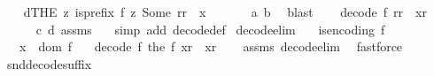 \begin{isabellebody}
\ \ \isamarkupfalse%
\ d{\isacharcolon}{\kern0pt}{\isachardoublequoteopen}{\isacharparenleft}{\kern0pt}THE\ z{\isachardot}{\kern0pt}\ is{\isacharunderscore}{\kern0pt}prefix\ {\isacharparenleft}{\kern0pt}f\ z{\isacharparenright}{\kern0pt}\ {\isacharparenleft}{\kern0pt}Some\ {\isacharparenleft}{\kern0pt}r{\isacharat}{\kern0pt}r{}{\isacharparenright}{\kern0pt}{\isacharparenright}{\kern0pt}{\isacharparenright}{\kern0pt}\ {\isacharequal}{\kern0pt}\ x{\isachardoublequoteclose}\ \isanewline
\ \ \ \ \isamarkupfalse%
\ a\ b\ \isamarkupfalse%
\ blast\isanewline
\ \ \isamarkupfalse%
\ {\isachardoublequoteopen}decode\ f\ {\isacharparenleft}{\kern0pt}r{\isacharat}{\kern0pt}r{}{\isacharparenright}{\kern0pt}\ {\isacharequal}{\kern0pt}\ {\isacharparenleft}{\kern0pt}x{\isacharcomma}{\kern0pt}r{}{\isacharparenright}{\kern0pt}{\isachardoublequoteclose}\isanewline
\ \ \ \ \isamarkupfalse%
\ c\ d\ assms{\isacharparenleft}{\kern0pt}{}{\isacharparenright}{\kern0pt}\ \isamarkupfalse%
\ \ {\isacharparenleft}{\kern0pt}simp\ add{\isacharcolon}{\kern0pt}\ decode{\isacharunderscore}{\kern0pt}def{\isacharparenright}{\kern0pt}\isanewline
{}\isamarkupfalse%
%
\endisatagproof
{\isafoldproof}%
%
\isadelimproof
\isanewline
%
\endisadelimproof
\isanewline
{}\isamarkupfalse%
\ decode{\isacharunderscore}{\kern0pt}elim{\isacharunderscore}{\kern0pt}{}{\isacharcolon}{\kern0pt}\isanewline
\ \ \ {\isachardoublequoteopen}is{\isacharunderscore}{\kern0pt}encoding\ f{\isachardoublequoteclose}\isanewline
\ \ \ {\isachardoublequoteopen}x\ {\isasymin}\ dom\ f{\isachardoublequoteclose}\isanewline
\ \ \ {\isachardoublequoteopen}decode\ f\ {\isacharparenleft}{\kern0pt}the\ {\isacharparenleft}{\kern0pt}f\ x{\isacharparenright}{\kern0pt}{\isacharat}{\kern0pt}r{}{\isacharparenright}{\kern0pt}\ {\isacharequal}{\kern0pt}\ {\isacharparenleft}{\kern0pt}x{\isacharcomma}{\kern0pt}r{}{\isacharparenright}{\kern0pt}{\isachardoublequoteclose}\isanewline
%
\isadelimproof
\ \ %
\endisadelimproof
%
\isatagproof
{}\isamarkupfalse%
\ assms\ decode{\isacharunderscore}{\kern0pt}elim\ \isamarkupfalse%
\ fastforce%
\endisatagproof
{\isafoldproof}%
%
\isadelimproof
\isanewline
%
\endisadelimproof
\isanewline
{}\isamarkupfalse%
\ snd{\isacharunderscore}{\kern0pt}decode{\isacharunderscore}{\kern0pt}suffix{\isacharcolon}{\kern0pt}\isanewline

\end{isabellebody}
